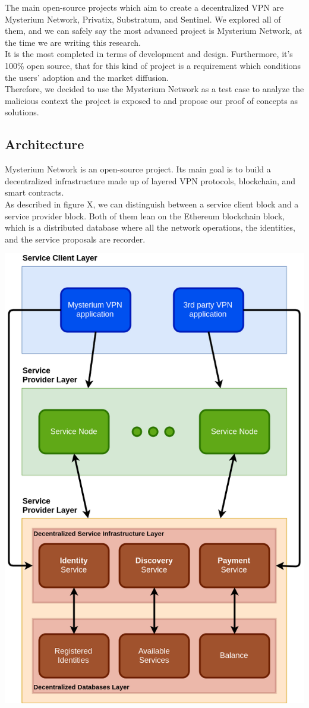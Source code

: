 \documentclass[12pt]{article}
\begin{document}
	The main open-source projects which aim to create a decentralized VPN are Mysterium Network, Privatix, Substratum, and Sentinel. We explored all of them, and we can safely say the most advanced project is Mysterium Network, at the time we are writing this research.\\It is the most completed in terms of development and design. Furthermore, it's 100\% open source, that for this kind of project is a requirement which conditions the users' adoption and the market diffusion.\\
	Therefore, we decided to use the Mysterium Network as a test case to analyze the malicious context the project is exposed to and propose our proof of concepts as solutions.
	
	\subsection{Architecture}
	Mysterium Network is an open-source project. Its main goal is to build a decentralized infrastructure made up of layered VPN protocols, blockchain, and smart contracts.\\
	As described in figure X, we can distinguish between a service client block and a service provider block. Both of them lean on the Ethereum blockchain block, which is a distributed database where all the network operations, the identities, and the service proposals are recorder.\\
	\bigbreak
	
	\begin{center}
		\includegraphics[width=0.5\linewidth]{images/mysterium_architecture.png}
	\end{center}
	\bigbreak
		
\end{document}
